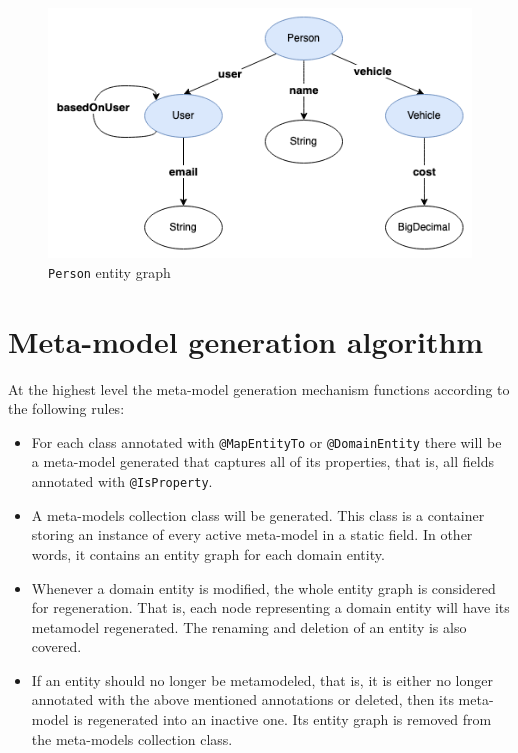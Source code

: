 \begin{figure}[H]\centering
    \includegraphics[scale=0.65]{images/entity-graph.drawio.png}
    \caption{\texttt{Person} entity graph}\label{fig:entity-graph}
\end{figure}

\section{Meta-model generation algorithm}
At the highest level the meta-model generation mechanism functions according to the following rules:
\begin{itemize}
    \item For each class annotated with \texttt{@MapEntityTo} or \texttt{@DomainEntity} there will be a meta-model generated that captures all of its properties, that is, all fields annotated with \texttt{@IsProperty}.
    \item A meta-models collection class will be generated. This class is a container storing an instance of every active meta-model in a static field. In other words, it contains an entity graph for each domain entity.
    \item Whenever a domain entity is modified, the whole entity graph is considered for regeneration. That is, each node representing a domain entity will have its metamodel regenerated. The renaming and deletion of an entity is also covered.
    \item If an entity should no longer be metamodeled, that is, it is either no longer annotated with the above mentioned annotations or deleted, then its meta-model is regenerated into an inactive one. Its entity graph is removed from the meta-models collection class.
\end{itemize}


